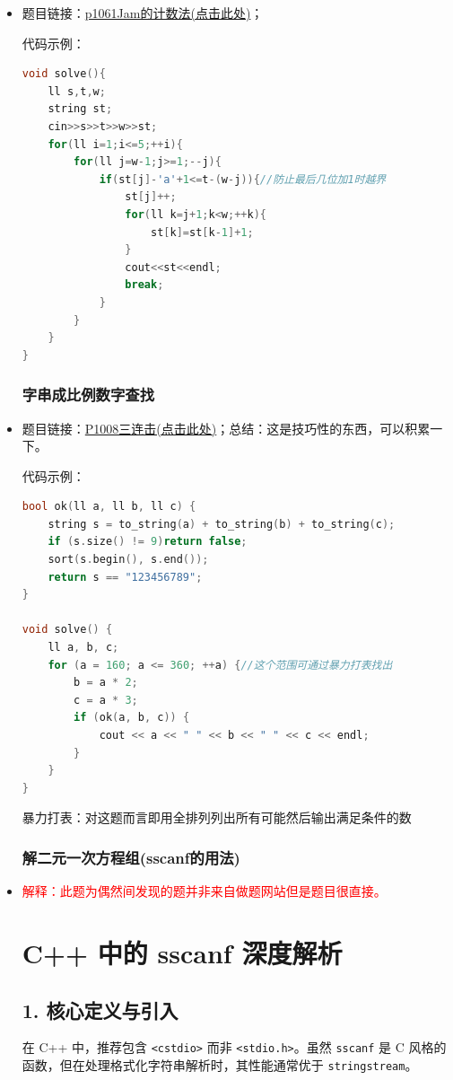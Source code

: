 \begin{itemize}
\subsubsection{P1061循环递增字母序列}
\item 题目链接：\href{https://www.luogu.com.cn/problem/P1061}{p1061Jam的计数法(点击此处)}；

代码示例：\\
\begin{lstlisting}[language=C++]
void solve(){
	ll s,t,w;
	string st;
	cin>>s>>t>>w>>st;
	for(ll i=1;i<=5;++i){
		for(ll j=w-1;j>=1;--j){
			if(st[j]-'a'+1<=t-(w-j)){//防止最后几位加1时越界
				st[j]++;
				for(ll k=j+1;k<w;++k){
					st[k]=st[k-1]+1;
				}
				cout<<st<<endl;
				break;
			}
		}
	}
}
\end{lstlisting}
\subsubsection{字串成比例数字查找}
\item 题目链接：\href{https://www.luogu.com.cn/problem/P1008}{P1008三连击(点击此处)}；总结：这是技巧性的东西，可以积累一下。

代码示例：\\
\begin{lstlisting}[language=C++]
bool ok(ll a, ll b, ll c) {
	string s = to_string(a) + to_string(b) + to_string(c);
	if (s.size() != 9)return false;
	sort(s.begin(), s.end());
	return s == "123456789";
}

void solve() {
	ll a, b, c;
	for (a = 160; a <= 360; ++a) {//这个范围可通过暴力打表找出
		b = a * 2;
		c = a * 3;
		if (ok(a, b, c)) {
			cout << a << " " << b << " " << c << endl;
		}
	}
}
\end{lstlisting}
暴力打表：对这题而言即用全排列列出所有可能然后输出满足条件的数
\subsubsection{解二元一次方程组(sscanf的用法)}
\item \textcolor{red}{解释：此题为偶然间发现的题并非来自做题网站但是题目很直接。}
\section*{C++ 中的 sscanf 深度解析}

\subsection*{1. 核心定义与引入}
在 C++ 中，推荐包含 \texttt{<cstdio>} 而非 \texttt{<stdio.h>}。虽然 \texttt{sscanf} 是 C 风格的函数，但在处理格式化字符串解析时，其性能通常优于 \texttt{stringstream}。


\end{itemize}
